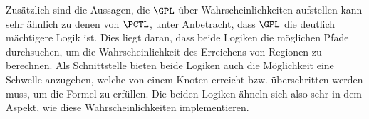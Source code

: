Zusätzlich sind die Aussagen, die $\GPL$ über Wahrscheinlichkeiten aufstellen kann sehr ähnlich zu denen von $\PCTL$, unter Anbetracht, dass $\GPL$ die deutlich mächtigere Logik ist.
Dies liegt daran, dass beide Logiken die möglichen Pfade durchsuchen, um die Wahrscheinlichkeit des Erreichens von Regionen zu berechnen.
Als Schnittstelle bieten beide Logiken auch die Möglichkeit eine Schwelle anzugeben, welche von einem Knoten erreicht bzw. überschritten werden muss, um die Formel zu erfüllen.
Die beiden Logiken ähneln sich also sehr in dem Aspekt, wie diese Wahrscheinlichkeiten implementieren.













